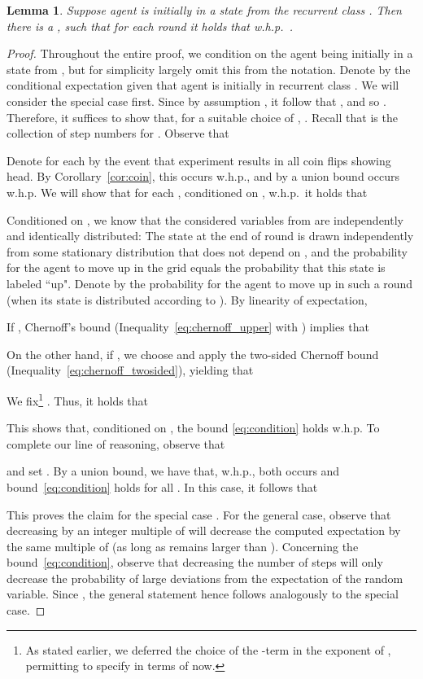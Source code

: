 \documentclass[11pt]{article}
\newtheorem{lemma}[theorem]{Lemma}
\begin{document}
\begin{lemma}
\label{lem:upwards}
	Suppose agent  is initially in a state from the recurrent class . Then there is a , such that for each round  it holds that w.h.p.\ .
\end{lemma}

\begin{proof}
Throughout the entire proof, we condition on the agent being initially in a state from , but for simplicity largely omit this from the notation. Denote by  the conditional expectation given that agent  is initially in recurrent class . We will consider the special case  first. Since by assumption , it follow that , and so .
Therefore, it suffices to show that, for a suitable choice of , . Recall that  is the collection of step numbers  for . Observe that
	
	Denote for each  by  the event that experiment  results in all coin flips showing head. By Corollary~\ref{cor:coin}, this occurs w.h.p., and by a union bound  occurs w.h.p. We will show that for each , conditioned on , w.h.p.\ it holds that
	
	Conditioned on , we know that the considered variables  from  are independently and identically distributed: The state at the end of round  is drawn independently from some stationary distribution  that does not depend on , and the probability for the agent to move up in the grid equals the probability that this state is labeled ``up". Denote by  the probability for the agent to move up in such a round  (when its state is distributed according to ). By linearity of expectation,
	
	
	
	If , Chernoff's bound (Inequality~\eqref{eq:chernoff_upper} with ) implies that
	
	On the other hand, if , we choose  and apply the two-sided Chernoff bound (Inequality~\eqref{eq:chernoff_twosided}), yielding that
	
	We fix\footnote{As stated earlier, we deferred the choice of the -term in the exponent of , permitting to specify  in terms of  now.} . Thus, it holds that
	
	This shows that, conditioned on , the bound \eqref{eq:condition} holds w.h.p. To complete our line of reasoning, observe that
	
	and set .	By a union bound, we have that, w.h.p., both  occurs and bound~\eqref{eq:condition} holds for all . In this case, it follows that
	
	This proves the claim for the special case . For the general case, observe that decreasing  by an integer multiple of  will decrease the computed expectation by the same multiple of  (as long as  remains larger than ). Concerning the bound~\eqref{eq:condition}, observe that decreasing the number of steps will only decrease the probability of large deviations from the expectation of the random variable.	Since , the general statement hence follows analogously to the special case.
\end{proof}
\end{document}
